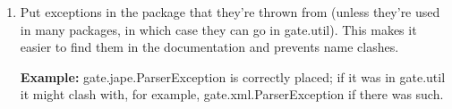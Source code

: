 \begin{enumerate}
{\bf Example:}\newline
The gate.creole package has a ResourceInstantiationException - this deals with
all problems to do with creating resources. We could have had
{\tt{}"{}}ResourceUrlProblem{\tt{}"{}} and {\tt{}"{}}ResourceParameterProblem{\tt{}"{}} but that would probably have
ended up with too many. On the other hand, just throwing everything as
GateException is too coarse (Hamish take note!).

\item 
Put exceptions in the package that they're thrown from (unless they're used in
many packages, in which case they can go in gate.util). This makes it easier to
find them in the documentation and prevents name clashes.\newline

{\bf Example:}\newline
gate.jape.ParserException is correctly placed; if it was in gate.util it might
clash with, for example, gate.xml.ParserException if there was such.
\end{enumerate}
